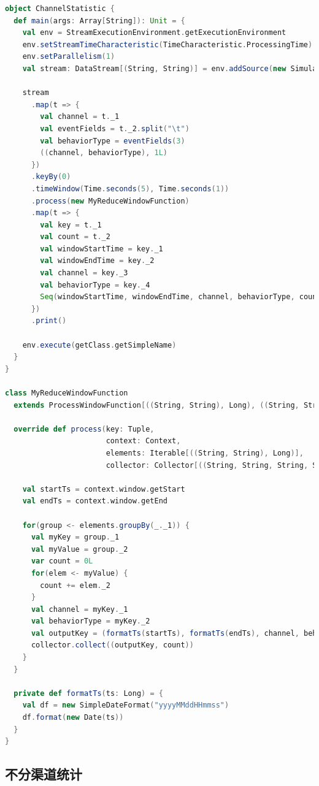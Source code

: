 \documentclass[oneside]{ctexbook}
\begin{document}
\begin{lstlisting}[language=scala]
object ChannelStatistic {
  def main(args: Array[String]): Unit = {
    val env = StreamExecutionEnvironment.getExecutionEnvironment
    env.setStreamTimeCharacteristic(TimeCharacteristic.ProcessingTime)
    env.setParallelism(1)
    val stream: DataStream[(String, String)] = env.addSource(new SimulatedEventSource)

    stream
      .map(t => {
        val channel = t._1
        val eventFields = t._2.split("\t")
        val behaviorType = eventFields(3)
        ((channel, behaviorType), 1L)
      })
      .keyBy(0)
      .timeWindow(Time.seconds(5), Time.seconds(1))
      .process(new MyReduceWindowFunction)
      .map(t => {
        val key = t._1
        val count = t._2
        val windowStartTime = key._1
        val windowEndTime = key._2
        val channel = key._3
        val behaviorType = key._4
        Seq(windowStartTime, windowEndTime, channel, behaviorType, count).mkString("\t")
      })
      .print()

    env.execute(getClass.getSimpleName)
  }
}

class MyReduceWindowFunction
  extends ProcessWindowFunction[((String, String), Long), ((String, String, String, String), Long), Tuple, TimeWindow] {

  override def process(key: Tuple,
                       context: Context,
                       elements: Iterable[((String, String), Long)],
                       collector: Collector[((String, String, String, String), Long)]): Unit = {

    val startTs = context.window.getStart
    val endTs = context.window.getEnd

    for(group <- elements.groupBy(_._1)) {
      val myKey = group._1
      val myValue = group._2
      var count = 0L
      for(elem <- myValue) {
        count += elem._2
      }
      val channel = myKey._1
      val behaviorType = myKey._2
      val outputKey = (formatTs(startTs), formatTs(endTs), channel, behaviorType)
      collector.collect((outputKey, count))
    }
  }

  private def formatTs(ts: Long) = {
    val df = new SimpleDateFormat("yyyyMMddHHmmss")
    df.format(new Date(ts))
  }
}
\end{lstlisting}

\subsection{不分渠道统计}
\end{document}
